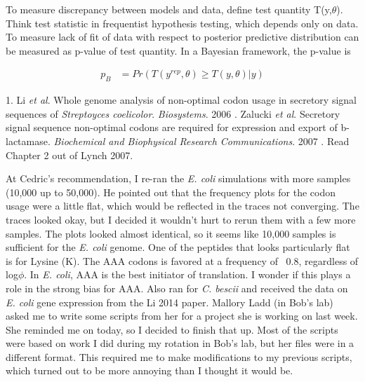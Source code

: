 \documentclass[11pt]{labbook}
\begin{document}

To measure discrepancy between models and data, define test quantity T(y,$\theta$). Think test statistic in frequentist hypothesis testing, which depends only on data. To measure lack of fit of data with respect to posterior predictive distribution can be measured as p-value of test quantity. In a Bayesian framework, the p-value is 

\begin{align*}
p_B &= Pr(T(y^{rep},\theta) \geq T(y,\theta)|y)
\end{align*}









1. Li \textit{et al}.
Whole genome analysis of non-optimal codon usage in secretory signal sequences of \textit{Streptoyces coelicolor}. \textit{Biosystems}. 2006
. Zalucki \textit{et al}. Secretory signal sequence non-optimal codons are required for expression and export of b-lactamase. \textit{Biochemical and Biophysical Research Communications}. 2007
. Read Chapter 2 out of Lynch 2007.
\let\cleardoublepage\clearpage

At Cedric's recommendation, I re-ran the \textit{E. coli} simulations with more samples (10,000 up to 50,000). He pointed out that the frequency plots for the codon usage were a little flat, which would be reflected in the traces not converging. The traces looked okay, but I decided it wouldn't hurt to rerun them with a few more samples. The plots looked almost identical, so it seems like 10,000 samples is sufficient for the \textit{E. coli} genome. One of the peptides that looks particularly flat is for Lysine (K). The AAA codons is favored at a frequency of ~0.8, regardless of log$\phi$. In \textit{E. coli}, AAA is the best initiator of translation. I wonder if this plays a role in the strong bias for AAA.
\newline
Also ran for \textit{C. bescii} and received the data on \textit{E. coli} gene expression from the Li 2014 paper.
\newline
Mallory Ladd (in Bob's lab) asked me to write some scripts from her for a project she is working on last week. She reminded me on today, so I decided to finish that up. Most of the scripts were based on work I did during my rotation in Bob's lab, but her files were in a different format. This required me to make modifications to my previous scripts, which turned out to be more annoying than I thought it would be.
\end{document}
